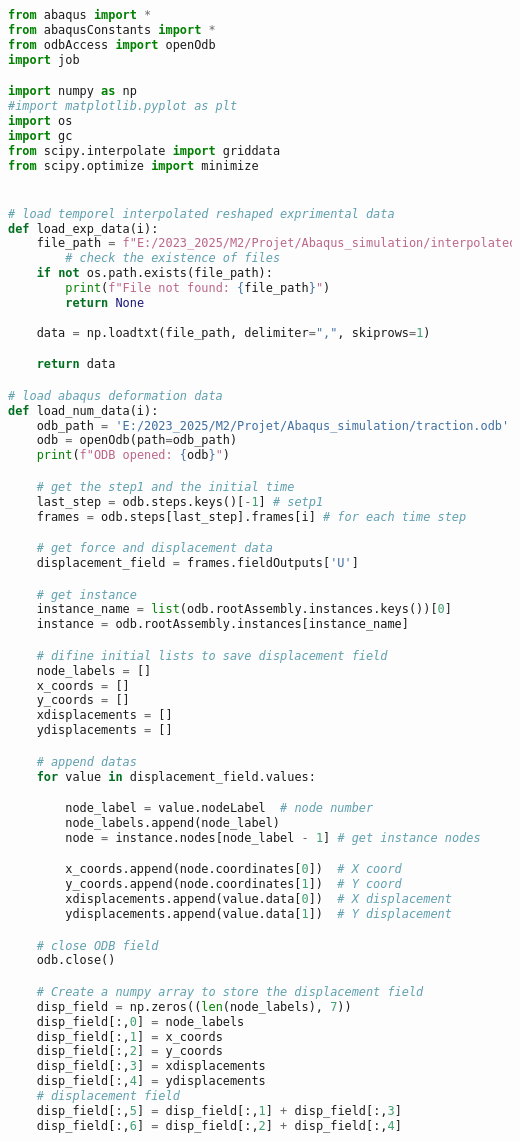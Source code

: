\documentclass[12pt,a4paper]{article}
\begin{document}
\begin{lstlisting}[language=Python, caption={Optimisation superposition}]
from abaqus import *
from abaqusConstants import *
from odbAccess import openOdb
import job

import numpy as np
#import matplotlib.pyplot as plt
import os
import gc
from scipy.interpolate import griddata
from scipy.optimize import minimize


# load temporel interpolated reshaped exprimental data
def load_exp_data(i):
    file_path = f"E:/2023_2025/M2/Projet/Abaqus_simulation/interpolated_exp_data/image_{i:03}.csv"
        # check the existence of files
    if not os.path.exists(file_path):
        print(f"File not found: {file_path}")
        return None
    
    data = np.loadtxt(file_path, delimiter=",", skiprows=1)

    return data

# load abaqus deformation data
def load_num_data(i):
    odb_path = 'E:/2023_2025/M2/Projet/Abaqus_simulation/traction.odb'
    odb = openOdb(path=odb_path)
    print(f"ODB opened: {odb}")

    # get the step1 and the initial time 
    last_step = odb.steps.keys()[-1] # setp1
    frames = odb.steps[last_step].frames[i] # for each time step

    # get force and displacement data
    displacement_field = frames.fieldOutputs['U']

    # get instance
    instance_name = list(odb.rootAssembly.instances.keys())[0]
    instance = odb.rootAssembly.instances[instance_name]

    # difine initial lists to save displacement field
    node_labels = []
    x_coords = []
    y_coords = []
    xdisplacements = []
    ydisplacements = []

    # append datas
    for value in displacement_field.values:

        node_label = value.nodeLabel  # node number
        node_labels.append(node_label) 
        node = instance.nodes[node_label - 1] # get instance nodes

        x_coords.append(node.coordinates[0])  # X coord
        y_coords.append(node.coordinates[1])  # Y coord
        xdisplacements.append(value.data[0])  # X displacement
        ydisplacements.append(value.data[1])  # Y displacement

    # close ODB field
    odb.close()

    # Create a numpy array to store the displacement field
    disp_field = np.zeros((len(node_labels), 7))
    disp_field[:,0] = node_labels
    disp_field[:,1] = x_coords
    disp_field[:,2] = y_coords
    disp_field[:,3] = xdisplacements 
    disp_field[:,4] = ydisplacements
    # displacement field
    disp_field[:,5] = disp_field[:,1] + disp_field[:,3] 
    disp_field[:,6] = disp_field[:,2] + disp_field[:,4]


\end{lstlisting}
\end{document}
